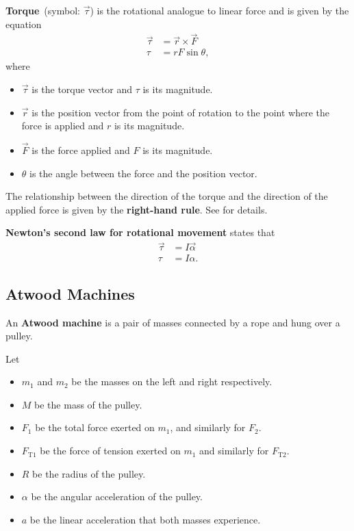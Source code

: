 \textbf{Torque}~(symbol: \(\vec{\tau}\)) is the rotational analogue
to linear force
and is given by the equation
\begin{equation}
    \begin{aligned}
        \vec{\tau} &= \vec{r} \times \vec{F} \\
        \tau &= r F \sin\theta,
    \end{aligned}
\end{equation}
where
\begin{itemize}
    \item \(\vec{\tau}\) is the torque vector and \(\tau\) is its magnitude.
    \item \(\vec{r}\) is the position vector from the point of rotation
        to the point where the force is applied
        and \(r\) is its magnitude.
    \item \(\vec{F}\) is the force applied and \(F\) is its magnitude.
    \item \(\theta\) is the angle between the force and the position vector.
\end{itemize}

The relationship between the direction of the torque
and the direction of the applied force is given by the \textbf{right-hand rule}.
See  for details.

\textbf{Newton's second law for rotational movement} states that
\begin{equation} \label{eq:newtons-2nd-law-rotational}
    \begin{aligned}
        \vec{\tau} &= I \vec{\alpha} \\
        \tau &= I \alpha.
    \end{aligned}
\end{equation}

\subsection{Atwood Machines}

An \textbf{Atwood machine} is a pair of masses connected by a rope
and hung over a pulley.

Let
\begin{itemize}
    \item \(m_1\) and \(m_2\) be
        the masses on the left and right respectively.
    \item \(M\) be the mass of the pulley.
    \item \(F_1\) be the total force exerted on \(m_1\),
        and similarly for \(F_2\).
    \item \(F_\mathrm{T1}\) be the force of tension exerted on \(m_1\)
        and similarly for \(F_\mathrm{T2}\).
    \item \(R\) be the radius of the pulley.
    \item \(\alpha\) be the angular acceleration of the pulley.
    \item \(a\) be the linear acceleration that both masses experience.
\end{itemize}

